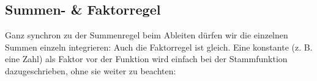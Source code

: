 \subsection{Summen- \& Faktorregel}
	Ganz synchron zu der Summenregel beim Ableiten dürfen wir die einzelnen Summen
	einzeln integrieren:
	\formel{\[\int (f(x)+g(x))\ dx=\int f(x)\ dx+\int g(x)\ dx\]}
	Auch die Faktorregel ist gleich. Eine konstante (z. B. eine Zahl) als Faktor
	vor der Funktion wird einfach bei der Stammfunktion dazugeschrieben, ohne sie
	weiter zu beachten:
	\formel{\[\int c\cdot f(x)\ dx=c\cdot \int f(x)\ dx\]}
